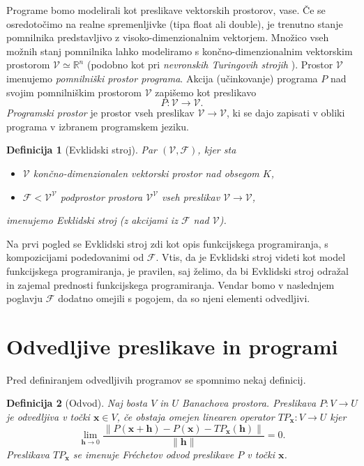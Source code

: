\documentclass[a4paper, 12pt]{book}
\newcommand{\RR}{\mathbb{R}}
\newcommand{\VV}{\mathcal{V}}
\newcommand{\x}{\mathbf{x}}
\newcommand{\h}{\mathbf{h}}
\newcommand{\F}{\mathcal{F}}
\newtheorem{definicija}{Definicija}[chapter]
\begin{document}
Programe bomo modelirali kot preslikave vektorskih prostorov, vase. Če se osredotočimo na realne spremenljivke (tipa float ali double), je trenutno stanje pomnilnika predstavljivo z visoko-dimenzionalnim vektorjem. Množico vseh možnih stanj pomnilnika lahko modeliramo s končno-dimenzionalnim vektorskim prostorom $\VV\simeq\RR^n$ (podobno kot pri \emph{nevronskih Turingovih strojih} \cite{neuTur}). Prostor $\VV$ imenujemo \emph{pomnilniški prostor programa}. Akcija (učinkovanje) programa $P$ nad svojim pomnilniškim prostorom $\VV$ zapišemo kot preslikavo
\begin{equation}
P:\VV\to\VV.
\end{equation}
\emph{Programski prostor} je prostor vseh preslikav $\VV\to\VV$, ki se dajo zapisati v obliki programa v izbranem programskem jeziku.
\begin{definicija}[Evklidski stroj]
Par $(\VV,\F)$, kjer sta
\begin{itemize}
\item
$\VV$ končno-dimenzionalen vektorski prostor nad obsegom $K$,
\item
$\F<\VV^\VV$ podprostor prostora $\VV^\VV$ vseh preslikav $\VV\to\VV$,
\end{itemize}
imenujemo \emph{Evklidski stroj} (z akcijami iz $\F$ nad $\VV$).
\end{definicija}

Na prvi pogled se Evklidski stroj zdi kot opis funkcijskega programiranja, s kompozicijami podedovanimi od $\F$. Vtis, da je Evklidski stroj videti kot model funkcijskega programiranja, je pravilen, saj želimo, da bi Evklidski stroj odražal in zajemal prednosti funkcijskega programiranja. Vendar bomo v naslednjem poglavju $\F$ dodatno omejili s pogojem, da so njeni elementi odvedljivi.

\section{Odvedljive preslikave in programi}

Pred definiranjem odvedljivih programov se spomnimo nekaj definicij.
\begin{definicija}[Odvod]
Naj bosta $V$ in $U$ Banachova prostora. Preslikava $P:V\to U$ je odvedljiva v točki
  $\x\in V$, če obstaja omejen linearen operator $TP_\x:V\to U$ kjer
  \begin{equation}
    \label{eq:frechet}
    \lim_{\h\to 0}\frac{\|P(\x+\h)-P(\x)-TP_\x(\h)\|}{\|\h\|} = 0.
  \end{equation}
  Preslikava $TP_\x$ se imenuje \emph{Fréchetov odvod} preslikave $P$ v točki $\x$.
\end{definicija}
\end{document}
